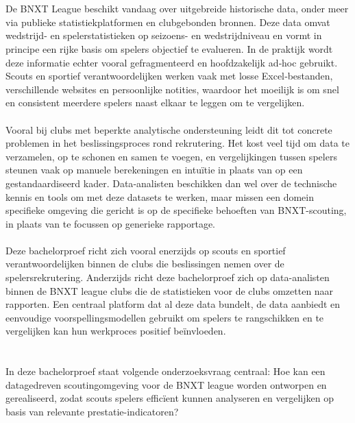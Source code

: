 \section{}%
\label{sec:probleemstelling}

De BNXT League beschikt vandaag over uitgebreide historische data, onder meer via publieke statistiekplatformen en clubgebonden bronnen. Deze data omvat wedstrijd- en spelerstatistieken op seizoens- en wedstrijdniveau en vormt in principe een rijke basis om spelers objectief te evalueren. In de praktijk wordt deze informatie echter vooral gefragmenteerd en hoofdzakelijk ad‑hoc gebruikt. Scouts en sportief verantwoordelijken werken vaak met losse Excel‑bestanden, verschillende websites en persoonlijke notities, waardoor het moeilijk is om snel en consistent meerdere spelers naast elkaar te leggen om te vergelijken.
\\\\
Vooral bij clubs met beperkte analytische ondersteuning leidt dit tot concrete problemen in het beslissingsproces rond rekrutering. Het kost veel tijd om data te verzamelen, op te schonen en samen te voegen, en vergelijkingen tussen spelers steunen vaak op manuele berekeningen en intuïtie in plaats van op een gestandaardiseerd kader. Data‑analisten beschikken dan wel over de technische kennis en tools om met deze datasets te werken, maar missen een domein specifieke omgeving die gericht is op de specifieke behoeften van BNXT-scouting, in plaats van te focussen op generieke rapportage.
\\\\
Deze bachelorproef richt zich vooral enerzijds op scouts en sportief verantwoordelijken binnen de clubs die beslissingen nemen over de spelersrekrutering. Anderzijds richt deze bachelorproef zich op data-analisten binnen de BNXT league clubs die de statistieken voor de clubs omzetten naar rapporten. Een centraal platform dat al deze data bundelt, de data aanbiedt en eenvoudige voorspellingsmodellen gebruikt om spelers te rangschikken en te vergelijken kan hun werkproces positief beïnvloeden.  

\section{}%
\label{sec:onderzoeksvraag}

In deze bachelorproef staat volgende onderzoeksvraag centraal: Hoe kan een datagedreven scoutingomgeving voor de BNXT league worden ontworpen en gerealiseerd, zodat scouts spelers efficïent kunnen analyseren en vergelijken op basis van relevante prestatie-indicatoren?

